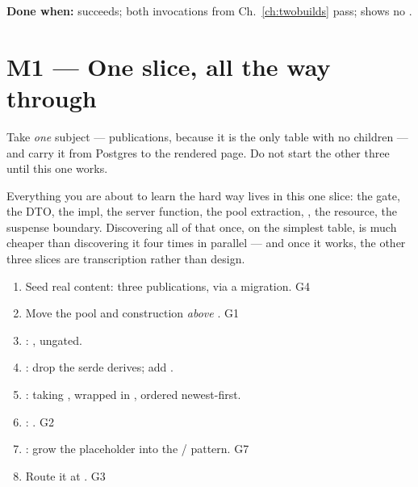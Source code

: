 \textbf{Done when:}  succeeds; both  invocations
from Ch.~\ref{ch:twobuilds} pass;  shows no .

\section{M1 --- One slice, all the way through}

\begin{keyidea}
Take \emph{one} subject --- publications, because it is the only table with no children --- and
carry it from Postgres to the rendered page. Do not start the other three until this one works.
\end{keyidea}

\begin{why}
Everything you are about to learn the hard way lives in this one slice: the gate, the DTO, the
 impl, the server function, the pool extraction, , the resource, the
suspense boundary. Discovering all of that once, on the simplest table, is much cheaper than
discovering it four times in parallel --- and once it works, the other three slices are
transcription rather than design.
\end{why}

\begin{runbook}[M1, in order]
\begin{enumerate}
  \item Seed real content: three publications, via a migration. G4
  \item Move the pool and  construction \emph{above} .
     G1
  \item {}: , ungated.
  \item {}: drop the serde derives; add .
  \item {}:  taking , wrapped in
    , ordered newest-first.
  \item {}: . G2
  \item {}: grow the placeholder into the
    / pattern. G7
  \item Route it at . G3
\end{enumerate}
\end{runbook}

